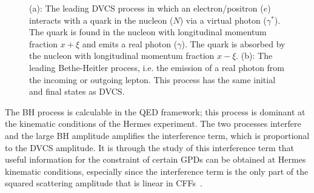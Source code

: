 \begin{figure}
\begin{center}
\caption[DVCS and Bethe Heitler hand bag diagram.]{(a): The leading DVCS process in which an electron/positron ($e$) interacts with a quark in the nucleon
($N$) via a virtual photon ($\gamma^\ast$). The quark is found in the
nucleon with longitudinal momentum fraction $x+\xi$ and emits a real
photon ($\gamma$). The quark is absorbed by the nucleon with
longitudinal momentum fraction $x-\xi$. (b): The leading Bethe-Heitler process, i.e. the emission of a real photon from the incoming or outgoing lepton. This process has the same initial and final states as DVCS.}
\label{spin}
\end{center}
\end{figure}
The BH process is calculable in the QED framework; this process is
dominant at the kinematic conditions of the H{\sc ermes} experiment. The
two processes interfere and the large BH amplitude
amplifies the interference term, which is proportional to the DVCS amplitude. It is through the study of this interference term that useful information for the constraint of certain GPDs can be obtained at H{\sc ermes} kinematic conditions, especially since the interference term is the only part of the squared scattering amplitude that is linear in CFFs~\cite{Bel02b}.

